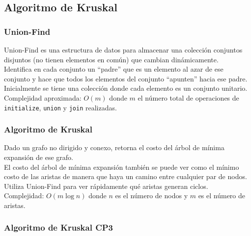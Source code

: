 \documentclass[10pt,letterpaper]{article}
\newcommand{\source}[1]{
  
  \dotfill
}
\begin{document}
  \subsection{Algoritmo de Kruskal}
    \subsubsection{Union-Find}
    Union-Find es una estructura de datos para almacenar una colección conjuntos disjuntos (no tienen elementos en común) que cambian dinámicamente.\\
    Identifica en cada conjunto un ``padre'' que es un elemento al azar de ese conjunto y hace que todos los elementos del conjunto ``apunten'' hacia ese padre. \\
    Inicialmente se tiene una colección donde cada elemento es un conjunto unitario.\\
    Complejidad aproximada: $O(m)$ donde $m$ el número total de operaciones de \verb|initialize|, \verb|union| y \verb|join| realizadas.\\
    \source{./src/union-find.cpp}

    \subsubsection{Algoritmo de Kruskal}
    Dado un grafo no dirigido y conexo, retorna el costo del árbol de mínima expansión de ese grafo.\\
    El costo del árbol de mínima expansión también se puede ver como el mínimo costo de las aristas de manera que haya un camino entre cualquier par de nodos.\\
    Utiliza Union-Find para ver rápidamente qué aristas generan ciclos.\\
    Complejidad: $O(m\operatorname{log} n)$ donde $n$ es el número de nodos y $m$ es el número de aristas.\\
    \source{./src/kruskal.cpp}
    
    \subsubsection{Algoritmo de Kruskal CP3}
    \source{./src/Kruskal-CP3.cpp}
\end{document}
